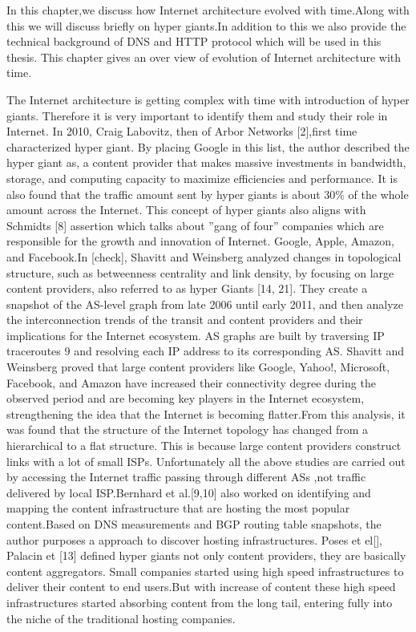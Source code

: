 In this chapter,we discuss how Internet architecture evolved with time.Along with this we will discuss briefly on hyper giants.In addition to this we also provide the technical background of DNS and HTTP protocol which will be used in this thesis.
This chapter gives an over view of evolution of Internet architecture with time. 

The Internet architecture is getting complex with time with introduction of hyper giants. Therefore it is very important to identify them and study their role in Internet. In 2010, Craig Labovitz, then of Arbor Networks [2],first time characterized hyper giant. By placing Google in this list, the author described the hyper giant as, a content provider that makes massive investments in bandwidth, storage, and computing capacity to maximize efficiencies and performance. It is also found that the traffic amount sent by hyper giants is about 30\% of the whole amount across the Internet. This concept of hyper giants also aligns with Schmidts [8] assertion which talks about ”gang of four” companies which are responsible for the growth and innovation of Internet. Google, Apple, Amazon, and Facebook.In [check], Shavitt and Weinsberg analyzed changes in topological structure, such as betweenness centrality and link density, by focusing on large content providers, also referred to as hyper Giants [14, 21]. They create a snapshot of the AS-level graph from late 2006 until early 2011, and then analyze the interconnection trends of the transit and content providers and their implications for the Internet ecosystem. AS graphs are built by traversing IP traceroutes 9 and resolving each IP address to its corresponding AS. Shavitt and Weinsberg proved that large content providers like Google, Yahoo!, Microsoft, Facebook, and Amazon have increased their connectivity degree during the observed period and are becoming key players in the Internet ecosystem, strengthening the idea that the Internet is becoming flatter.From this analysis, it was found that the structure of the Internet topology has changed from a hierarchical to a flat structure. This is because large content providers construct links with a lot of small ISPs. 
Unfortunately all the above studies are carried out by accessing the Internet traffic passing through different ASs ,not traffic delivered by local ISP.Bernhard et al.[9,10] also worked on identifying and mapping the content infrastructure that are hosting the most popular content.Based on DNS measurements and BGP routing table snapshots, the author purposes a approach to discover hosting infrastructures. Poses et el[],  Palacin et [13] defined hyper giants not only content providers, they are basically content aggregators. Small companies started using high speed infrastructures to deliver their content to end users.But with increase of content  these high speed infrastructures started absorbing content from the long tail, entering fully into the niche of the traditional hosting companies.



